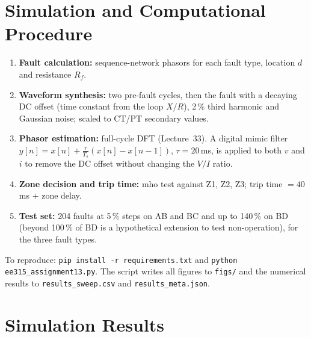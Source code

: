 \documentclass[11pt,a4paper]{article}
\begin{document}
\section{Simulation and Computational Procedure}
\begin{enumerate}
\item \textbf{Fault calculation:} sequence-network phasors for each fault type, location $d$ and resistance $R_f$.
\item \textbf{Waveform synthesis:} two pre-fault cycles, then the fault with a decaying DC offset (time constant from the loop $X/R$), 2\,\% third harmonic and Gaussian noise; scaled to CT/PT secondary values.
\item \textbf{Phasor estimation:} full-cycle DFT (Lecture~33). A digital mimic filter $y[n]=x[n]+\frac{\tau}{T_s}(x[n]-x[n-1])$, $\tau=20$\,ms, is applied to both $v$ and $i$ to remove the DC offset without changing the $V/I$ ratio.
\item \textbf{Zone decision and trip time:} mho test against Z1, Z2, Z3; trip time $=40$\,ms + zone delay.
\item \textbf{Test set:} 204 faults at 5\,\% steps on AB and BC and up to 140\,\% on BD (beyond 100\,\% of BD is a hypothetical extension to test non-operation), for the three fault types.
\end{enumerate}
To reproduce: \texttt{pip install -r requirements.txt} and \texttt{python ee315\_assignment13.py}. The script writes all figures to \texttt{figs/} and the numerical results to \texttt{results\_sweep.csv} and \texttt{results\_meta.json}.

\section{Simulation Results}
\end{document}
